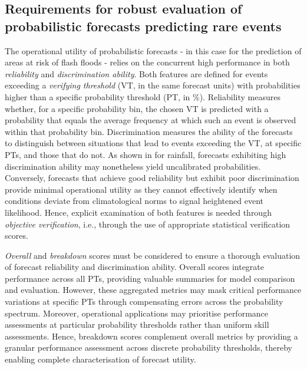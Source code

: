\subsection{Requirements for robust evaluation of probabilistic forecasts predicting rare events}

The  operational utility of probabilistic forecasts - in this case for the prediction of areas at risk of flash floods - relies on the concurrent high performance in both \textit{reliability} and \textit{discrimination ability}. Both features are defined for events exceeding a \textit{verifying threshold} (VT, in the same forecast units) with probabilities higher than a specific probability threshold (PT, in \%). Reliability measures whether, for a specific probability bin, the chosen VT is predicted with a probability that equals the average frequency at which such an event is observed within that probability bin. Discrimination measures the ability of the forecasts to distinguish between situations that lead to events exceeding the VT, at specific PTs, and those that do not. As shown in \citet{Pillosu_2025} for rainfall, forecasts exhibiting high discrimination ability may nonetheless yield uncalibrated probabilities. Conversely, forecasts that achieve good reliability but exhibit poor discrimination provide minimal operational utility as they cannot effectively identify when conditions deviate from climatological norms to signal heightened event likelihood. Hence, explicit examination of both features is needed through \textit{objective verification}, i.e., through the use of appropriate statistical verification scores.

\textit{Overall}  and \textit{breakdown} scores must be considered to ensure a thorough evaluation of forecast reliability and discrimination ability. Overall scores integrate performance across all PTs, providing valuable summaries for model comparison and evaluation. However, these aggregated metrics may mask critical performance variations at specific PTs through compensating errors across the probability spectrum. Moreover, operational applications may prioritise performance assessments at particular probability thresholds rather than uniform skill assessments. Hence, breakdown scores complement overall metrics by providing a granular performance assessment across discrete probability thresholds, thereby enabling complete characterisation of forecast utility.

